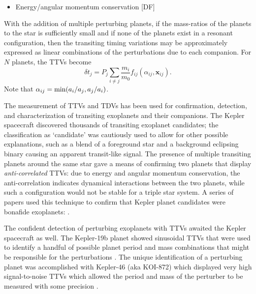 \documentclass[graybox,natbib,nosecnum]{svmult}
\begin{document}
\begin{itemize}
\item Energy/angular momentum conservation [DF]
\end{itemize}

With the addition of multiple perturbing planets, if the mass-ratios of the planets to the star is
sufficiently small and if none of the planets exist in a resonant configuration, then the transiting timing 
variations may be approximately expressed as linear combinations of the perturbations due to each companion.
For $N$ planets, the TTVs become
\begin{equation}
\delta t_j = P_j \sum_{i \ne j}  \frac{m_i}{m_0} f_{ij}(\alpha_{ij},\mathbf{x}_{ij}).
\end{equation}
Note that $\alpha_{ij} = {\rm min}(a_i/a_j,a_j/a_i)$.

The measurement of TTVs and TDVs has been used for confirmation, detection, and characterization of
transiting exoplanets and their companions.  The Kepler spacecraft discovered thousands of transiting
exoplanet candidates;  the classification as `candidate' was cautiously used to allow for other
possible explanations, such as a blend of a foreground star and a background eclipsing binary causing
an apparent transit-like signal.  The presence of multiple transiting planets around the same star
gave a means of confirming two planets that display {\em anti-correlated} TTVs: due to energy and
angular momentum conservation, the anti-correlation indicates dynamical interactions between the
two planets, while such a configuration would not be stable for a triple star system.  A series of papers 
used this technique to confirm that Kepler planet candidates were bonafide exoplanets:
\citet{2011ApJS..197....2F, 2012ApJ...750..113F, 2012ApJ...750..114F, 2012ApJ...756..185F, 
2012MNRAS.421.2342S, 2013MNRAS.428.1077S, 2013ApJS..208...22X, 2014ApJS..210...25X}.

The confident detection of perturbing exoplanets with TTVs awaited the Kepler spacecraft as
well.  The Kepler-19b planet showed sinusoidal TTVs that were used to identify a handful
of possible planet period and mass combinations that might be responsible for the perturbations \citep{2011ApJ...743..200B}.
The unique identification of a perturbing planet was accomplished with Kepler-46 (aka KOI-872)
which displayed very high signal-to-noise TTVs which allowed the period and mass of the
perturber to be measured with some precision \citep{2012Sci...336.1133N}.
\end{document}
